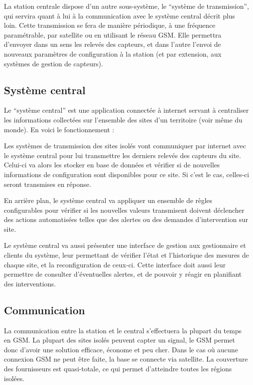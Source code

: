 La station centrale dispose d'un autre sous-système, le ``système de transmission'', qui servira quant à lui à la communication avec le système central décrit plus loin. Cette transmission se fera de manière périodique, à une fréquence paramétrable, par satellite ou en utilisant le réseau GSM. Elle permettra d'envoyer dans un sens les relevés des capteurs, et dans l'autre l'envoi de nouveaux paramètres de configuration à la station (et par extension, aux systèmes de gestion de capteurs).

\subsection{Système central}

Le ``système central'' est une application connectée à internet servant à centraliser les informations collectées sur l'ensemble des sites d'un territoire (voir même du monde). En voici le fonctionnement :

Les systèmes de transmission des sites isolés vont communiquer par internet avec le système central pour lui transmettre les derniers relevés des capteurs du site. Celui-ci va alors les stocker en base de données et vérifier si de nouvelles informations de configuration sont disponibles pour ce site. Si c'est le cas, celles-ci seront transmises en réponse.

En arrière plan, le système central va appliquer un ensemble de règles configurables pour vérifier si les nouvelles valeurs transmisent doivent déclencher des actions automatisées telles que des alertes ou des demandes d'intervention sur site.

Le système central va aussi présenter une interface de gestion aux gestionnaire et clients du système, leur permettant de vérifier l'état et l'historique des mesures de chaque site, et la reconfiguration de ceux-ci. Cette interface doit aussi leur permettre de consulter d'éventuelles alertes, et de pouvoir y réagir en planifiant des interventions.

\subsection{Communication}

La communication entre la station et le central s’effectuera la plupart du temps en GSM. La plupart des sites isolés peuvent capter un signal, le GSM permet donc d’avoir une solution efficace, économe et peu cher. Dans le cas où aucune connexion GSM ne peut être faite, la base se connecte via satellite. La couverture des fournisseurs est quasi-totale, ce qui permet d’atteindre toutes les régions isolées. 

